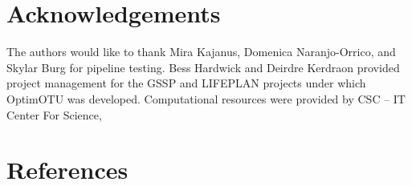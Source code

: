 \documentclass[
]{article}
\begin{document}
\section*{Acknowledgements}\label{acknowledgements}

The authors would like to thank Mira Kajanus, Domenica Naranjo-Orrico, and Skylar Burg for pipeline testing. Bess Hardwick and Deirdre Kerdraon provided project management for the GSSP and LIFEPLAN projects under which OptimOTU was developed. Computational resources were provided by CSC -- IT Center For Science,

\section*{References}\label{references}
\end{document}
